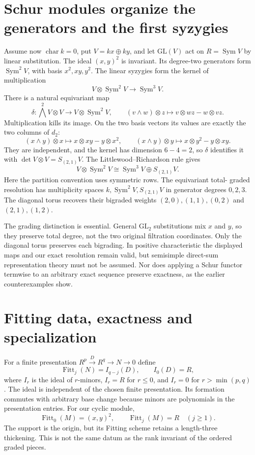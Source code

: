 \documentclass[11pt,oneside,openany]{book}
\theoremstyle{definition}\newtheorem{definition}[theorem]{Definition}
\theoremstyle{remark}\newtheorem{remark}[theorem]{Remark}
\begin{document}
\section{Schur modules organize the generators and the first syzygies}
Assume now $\operatorname{char}k=0$, put $V=kx\oplus ky$, and let
$\mathrm{GL}(V)$ act on $R=\operatorname{Sym}V$ by linear substitution.
The ideal $(x,y)^2$ is invariant. Its degree-two generators form
$\operatorname{Sym}^2V$, with basis $x^2,xy,y^2$.
The linear syzygies form the kernel of multiplication
\[
 V\otimes\operatorname{Sym}^2V\longrightarrow\operatorname{Sym}^3V.
\]
There is a natural equivariant map
\[
 \delta:\bigwedge^2V\otimes V\longrightarrow V\otimes\operatorname{Sym}^2V,
 \qquad (v\wedge w)\otimes z\longmapsto
       v\otimes wz-w\otimes vz.
\]
Multiplication kills its image. On the two basis vectors its values are
exactly the two columns of $d_2$:
\[
 (x\wedge y)\otimes x\mapsto x\otimes xy-y\otimes x^2,
 \qquad
 (x\wedge y)\otimes y\mapsto x\otimes y^2-y\otimes xy.
\]
They are independent, and the kernel has dimension $6-4=2$, so $\delta$
identifies it with $\det V\otimes V=S_{(2,1)}V$. The Littlewood--Richardson
rule gives
\[
 V\otimes\operatorname{Sym}^2V
 \cong\operatorname{Sym}^3V\oplus S_{(2,1)}V.
\]
Here the partition convention uses symmetric rows. The equivariant total-
graded resolution has multiplicity spaces
$k,\operatorname{Sym}^2V,S_{(2,1)}V$ in generator degrees $0,2,3$.
The diagonal torus recovers their bigraded weights
$(2,0),(1,1),(0,2)$ and $(2,1),(1,2)$.

The grading distinction is essential. General $\mathrm{GL}_2$ substitutions
mix $x$ and $y$, so they preserve total degree, not the two original
filtration coordinates. Only the diagonal torus preserves each bigrading.
In positive characteristic the displayed maps and our exact resolution
remain valid, but semisimple direct-sum representation theory must not
be assumed. Nor does applying a Schur functor termwise to an arbitrary
exact sequence preserve exactness, as the earlier counterexamples show.

\section{Fitting data, exactness and specialization}
For a finite presentation $R^p\xrightarrow D R^q\to N\to0$ define
\[
 \operatorname{Fitt}_j(N)=I_{q-j}(D),\qquad
 I_0(D)=R,
\]
where $I_r$ is the ideal of $r$-minors, $I_r=R$ for $r\le0$, and
$I_r=0$ for $r>\min(p,q)$. The ideal is independent of the chosen finite
presentation. Its formation commutes with arbitrary base change because
minors are polynomials in the presentation entries. For our cyclic module,
\[
 \operatorname{Fitt}_0(M)=(x,y)^2,\qquad
 \operatorname{Fitt}_j(M)=R\quad(j\ge1).
\]
The support is the origin, but its Fitting scheme retains a length-three
thickening. This is not the same datum as the rank invariant of the
ordered graded pieces.
\end{document}
